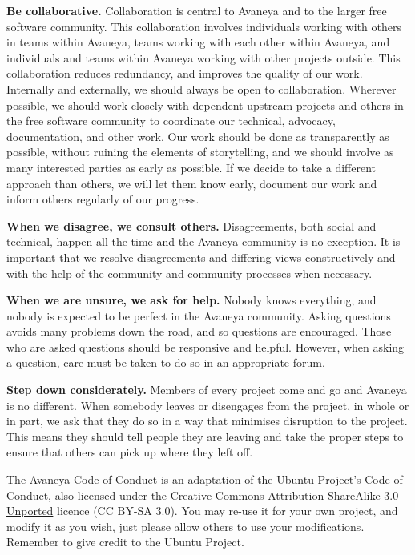 \item
{\bf Be collaborative.} Collaboration is central to Avaneya and to the larger free software community. This collaboration involves individuals working with others in teams within Avaneya, teams working with each other within Avaneya, and individuals and teams within Avaneya working with other projects outside. This collaboration reduces redundancy, and improves the quality of our work. Internally and externally, we should always be open to collaboration. Wherever possible, we should work closely with dependent upstream projects and others in the free software community to coordinate our technical, advocacy, documentation, and other work. Our work should be done as transparently as possible, without ruining the elements of storytelling, and we should involve as many interested parties as early as possible. If we decide to take a different approach than others, we will let them know early, document our work and inform others regularly of our progress.

\item
{\bf When we disagree, we consult others.} Disagreements, both social and technical, happen all the time and the Avaneya community is no exception. It is important that we resolve disagreements and differing views constructively and with the help of the community and community processes when necessary.

\item
{\bf When we are unsure, we ask for help.} Nobody knows everything, and nobody is expected to be perfect in the Avaneya community. Asking questions avoids many problems down the road, and so questions are encouraged. Those who are asked questions should be responsive and helpful. However, when asking a question, care must be taken to do so in an appropriate forum.

\item
{\bf Step down considerately.} Members of every project come and go and Avaneya is no different. When somebody leaves or disengages from the project, in whole or in part, we ask that they do so in a way that minimises disruption to the project. This means they should tell people they are leaving and take the proper steps to ensure that others can pick up where they left off.
\stopitemize

The Avaneya Code of Conduct is an adaptation of the Ubuntu Project's Code of Conduct, also licensed under the \href{http://creativecommons.org/licenses/by-sa/3.0/}{Creative Commons Attribution-ShareAlike 3.0 Unported} licence (CC BY-SA 3.0). You may re-use it for your own project, and modify it as you wish, just please allow others to use your modifications. Remember to give credit to the Ubuntu Project.


